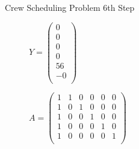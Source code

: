\documentclass{beamer}
\begin{document}
\begin{frame}{Crew Scheduling Problem}
    6th Step
    \begin{figure}[!htb]
        \begin{minipage}{0.48\textwidth}
            \centering
            $Y = \begin{pmatrix}0\\ 0\\ 0\\ 0\\ 56\\ -0\\ \end{pmatrix}$
            \end{minipage}
        \begin{minipage}{0.48\textwidth}
            $A = \begin{pmatrix}
                1 & 1 & 0 & 0 & 0 & 0\\
                1 & 0 & 1 & 0 & 0 & 0\\
                1 & 0 & 0 & 1 & 0 & 0\\
                1 & 0 & 0 & 0 & 1 & 0\\
                1 & 0 & 0 & 0 & 0 & 1\\
            \end{pmatrix}$
        \end{minipage}
    \end{figure}
\end{frame}
\end{document}
